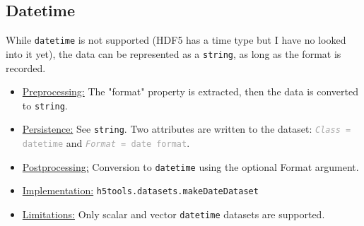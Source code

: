 \documentclass[11pt]{exam}
\newcommand\myfcn[1]{\colorbox{codegray}{\textcolor{codeblue}{\texttt{#1}}}}
\newcommand\myatt[2]{\textcolor{darkgray}{\texttt{\textit{#1} = #2}}}
\begin{document}
        \subsection{Datetime}
        \noindent While \texttt{datetime} is not supported (HDF5 has a time type but I have no looked into it yet), the data can be represented as a \texttt{string}, as long as the format is recorded. 
        \noindent\begin{itemize}
            \item \underline{Preprocessing:} The "format" property is extracted, then the data is converted to \texttt{string}.
            \item \underline{Persistence:} See \texttt{string}. Two attributes are written to the dataset: \myatt{Class}{datetime} and \myatt{Format}{date format}.
            \item \underline{Postprocessing:} Conversion to \texttt{datetime} using the optional Format argument. 
            \item \underline{Implementation:} \myfcn{h5tools.datasets.makeDateDataset}
            \item \underline{Limitations:} Only scalar and vector \texttt{datetime} datasets are supported.
        \end{itemize}
        
\end{document}
